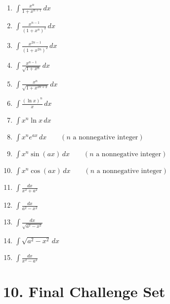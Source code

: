 \documentclass[11pt]{article}
\begin{document}
\begin{enumerate}
\item $\displaystyle \int \frac{x^{n}}{1+x^{n+1}}\,dx$
\item $\displaystyle \int \frac{x^{n-1}}{(1+x^n)^2}\,dx$
\item $\displaystyle \int \frac{x^{2n-1}}{(1+x^{2n})^2}\,dx$
\item $\displaystyle \int \frac{x^{n-1}}{\sqrt{1+x^n}}\,dx$
\item $\displaystyle \int \frac{x^{n}}{\sqrt{1+x^{2n+2}}}\,dx$
\item $\displaystyle \int \frac{(\ln x)^{n}}{x}\,dx$
\item $\displaystyle \int x^n\ln x\,dx$
\item $\displaystyle \int x^n e^{ax}\,dx
\qquad (n\text{ a nonnegative integer})$
\item $\displaystyle \int x^n\sin(ax)\,dx
\qquad (n\text{ a nonnegative integer})$
\item $\displaystyle \int x^n\cos(ax)\,dx
\qquad (n\text{ a nonnegative integer})$
\item $\displaystyle \int \frac{dx}{x^2+a^2}$
\item $\displaystyle \int \frac{dx}{a^2-x^2}$
\item $\displaystyle \int \frac{dx}{\sqrt{a^2-x^2}}$
\item $\displaystyle \int \sqrt{a^2-x^2}\,dx$
\item $\displaystyle \int \frac{dx}{x^2-a^2}$
\end{enumerate}

\section*{10. Final Challenge Set}
\end{document}
